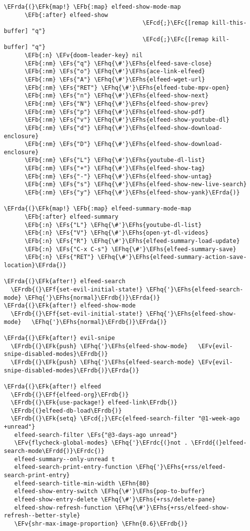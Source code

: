 \documentclass[a4wide,10pt]{article}
\newcommand{\EFc}[1]{\textcolor{EFc}{#1}} %
\newcommand{\EFcd}[1]{\textcolor{EFcd}{#1}} %
\newcommand{\EFs}[1]{\textcolor{EFs}{#1}} %
\newcommand{\EFk}[1]{\textcolor{EFk}{#1}} %
\newcommand{\EFb}[1]{\textcolor{EFb}{#1}} %
\newcommand{\EFf}[1]{\textcolor{EFf}{#1}} %
\newcommand{\EFv}[1]{\textcolor{EFv}{#1}} %
\newcommand{\EFhn}[1]{\textcolor{EFhn}{\textbf{#1}}} %
\newcommand{\EFhq}[1]{\textcolor{EFhq}{#1}} %
\newcommand{\EFhs}[1]{\textcolor{EFhs}{#1}} %
\newcommand{\EFrda}[1]{\textcolor{EFrda}{#1}} %
\newcommand{\EFrdb}[1]{\textcolor{EFrdb}{#1}} %
\newcommand{\EFrdc}[1]{\textcolor{EFrdc}{#1}} %
\newcommand{\EFrdd}[1]{\textcolor{EFrdd}{#1}} %
\begin{document}
\begin{Code}
\begin{Verbatim}
\EFrda{(}\EFk{map!} \EFb{:map} elfeed-show-mode-map
      \EFb{:after} elfeed-show
                                        \EFcd{;}\EFc{[remap kill-this-buffer] "q"}
                                        \EFcd{;}\EFc{[remap kill-buffer] "q"}
      \EFb{:n} \EFv{doom-leader-key} nil
      \EFb{:nm} \EFs{"q"} \EFhq{\#'}\EFhs{elfeed-save-close}
      \EFb{:nm} \EFs{"o"} \EFhq{\#'}\EFhs{ace-link-elfeed}
      \EFb{:nm} \EFs{"A"} \EFhq{\#'}\EFhs{elfeed-wget-url}
      \EFb{:nm} \EFs{"RET"} \EFhq{\#'}\EFhs{elfeed-tube-mpv-open}
      \EFb{:nm} \EFs{"n"} \EFhq{\#'}\EFhs{elfeed-show-next}
      \EFb{:nm} \EFs{"N"} \EFhq{\#'}\EFhs{elfeed-show-prev}
      \EFb{:nm} \EFs{"p"} \EFhq{\#'}\EFhs{elfeed-show-pdf}
      \EFb{:nm} \EFs{"v"} \EFhq{\#'}\EFhs{elfeed-show-youtube-dl}
      \EFb{:nm} \EFs{"d"} \EFhq{\#'}\EFhs{elfeed-show-download-enclosure}
      \EFb{:nm} \EFs{"D"} \EFhq{\#'}\EFhs{elfeed-show-download-enclosure}
      \EFb{:nm} \EFs{"L"} \EFhq{\#'}\EFhs{youtube-dl-list}
      \EFb{:nm} \EFs{"+"} \EFhq{\#'}\EFhs{elfeed-show-tag}
      \EFb{:nm} \EFs{"-"} \EFhq{\#'}\EFhs{elfeed-show-untag}
      \EFb{:nm} \EFs{"s"} \EFhq{\#'}\EFhs{elfeed-show-new-live-search}
      \EFb{:nm} \EFs{"y"} \EFhq{\#'}\EFhs{elfeed-show-yank}\EFrda{)}

\EFrda{(}\EFk{map!} \EFb{:map} elfeed-summary-mode-map
      \EFb{:after} elfeed-summary
      \EFb{:n} \EFs{"L"} \EFhq{\#'}\EFhs{youtube-dl-list}
      \EFb{:n} \EFs{"V"} \EFhq{\#'}\EFhs{open-yt-dl-videos}
      \EFb{:n} \EFs{"R"} \EFhq{\#'}\EFhs{elfeed-summary-load-update}
      \EFb{:n} \EFs{"C-x C-s"} \EFhq{\#'}\EFhs{elfeed-summary-save}
      \EFb{:n} \EFs{"RET"} \EFhq{\#'}\EFhs{elfeed-summary-action-save-location}\EFrda{)}

\EFrda{(}\EFk{after!} elfeed-search
  \EFrdb{(}\EFf{set-evil-initial-state!} \EFhq{'}\EFhs{elfeed-search-mode} \EFhq{'}\EFhs{normal}\EFrdb{)}\EFrda{)}
\EFrda{(}\EFk{after!} elfeed-show-mode
  \EFrdb{(}\EFf{set-evil-initial-state!} \EFhq{'}\EFhs{elfeed-show-mode}   \EFhq{'}\EFhs{normal}\EFrdb{)}\EFrda{)}

\EFrda{(}\EFk{after!} evil-snipe
  \EFrdb{(}\EFk{push} \EFhq{'}\EFhs{elfeed-show-mode}   \EFv{evil-snipe-disabled-modes}\EFrdb{)}
  \EFrdb{(}\EFk{push} \EFhq{'}\EFhs{elfeed-search-mode} \EFv{evil-snipe-disabled-modes}\EFrdb{)}\EFrda{)}

\EFrda{(}\EFk{after!} elfeed
  \EFrdb{(}\EFf{elfeed-org}\EFrdb{)}
  \EFrdb{(}\EFk{use-package!} elfeed-link\EFrdb{)}
  \EFrdb{(}elfeed-db-load\EFrdb{)}
  \EFrdb{(}\EFk{setq} \EFcd{;}\EFc{elfeed-search-filter "@1-week-ago +unread"}
   elfeed-search-filter \EFs{"@3-days-ago unread"}
   \EFv{flycheck-global-modes} \EFhq{'}\EFrdc{(}not . \EFrdd{(}elfeed-search-mode\EFrdd{)}\EFrdc{)}
   elfeed-summary--only-unread t
   elfeed-search-print-entry-function \EFhq{'}\EFhs{+rss/elfeed-search-print-entry}
   elfeed-search-title-min-width \EFhn{80}
   elfeed-show-entry-switch \EFhq{\#'}\EFhs{pop-to-buffer}
   elfeed-show-entry-delete \EFhq{\#'}\EFhs{+rss/delete-pane}
   elfeed-show-refresh-function \EFhq{\#'}\EFhs{+rss/elfeed-show-refresh--better-style}
   \EFv{shr-max-image-proportion} \EFhn{0.6}\EFrdb{)}



\end{Verbatim}
\end{Code}
\end{document}
